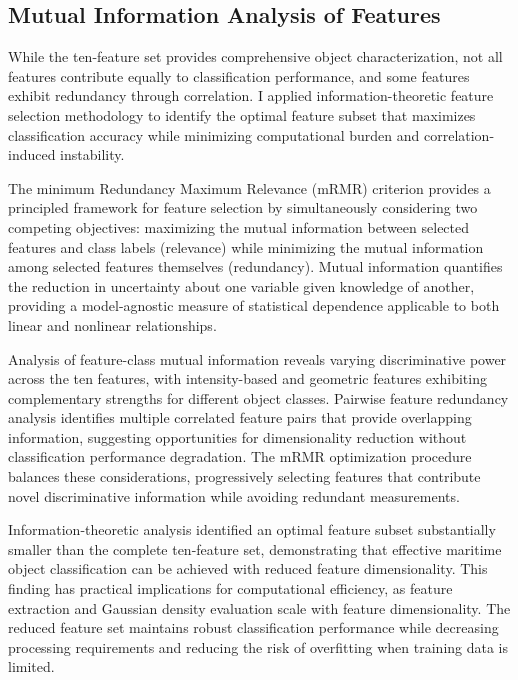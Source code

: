 \documentclass{erauthesis}
\begin{document}
\subsection{Mutual Information Analysis of Features} \label{sec:gbcache_MI_features}

While the ten-feature set provides comprehensive object characterization, not all features contribute equally to classification performance, and some features exhibit redundancy through correlation.
I applied information-theoretic feature selection methodology to identify the optimal feature subset that maximizes classification accuracy while minimizing computational burden and correlation-induced instability.

The minimum Redundancy Maximum Relevance (mRMR) criterion provides a principled framework for feature selection by simultaneously considering two competing objectives: maximizing the mutual information between selected features and class labels (relevance) while minimizing the mutual information among selected features themselves (redundancy).
Mutual information quantifies the reduction in uncertainty about one variable given knowledge of another, providing a model-agnostic measure of statistical dependence applicable to both linear and nonlinear relationships.

Analysis of feature-class mutual information reveals varying discriminative power across the ten features, with intensity-based and geometric features exhibiting complementary strengths for different object classes.
Pairwise feature redundancy analysis identifies multiple correlated feature pairs that provide overlapping information, suggesting opportunities for dimensionality reduction without classification performance degradation.
The mRMR optimization procedure balances these considerations, progressively selecting features that contribute novel discriminative information while avoiding redundant measurements.

Information-theoretic analysis identified an optimal feature subset substantially smaller than the complete ten-feature set, demonstrating that effective maritime object classification can be achieved with reduced feature dimensionality.
This finding has practical implications for computational efficiency, as feature extraction and Gaussian density evaluation scale with feature dimensionality.
The reduced feature set maintains robust classification performance while decreasing processing requirements and reducing the risk of overfitting when training data is limited.
\end{document}
